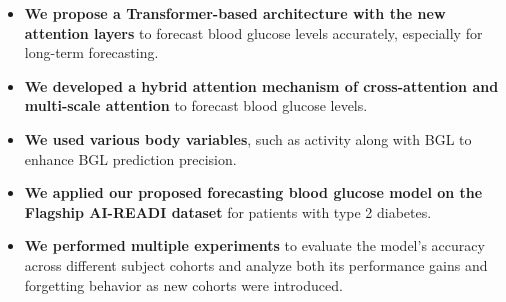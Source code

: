 \begin{itemize}
    \item \textbf{We propose a Transformer-based architecture with the new attention layers} to forecast blood glucose levels accurately, especially for long-term forecasting.
    \item \textbf{We developed a hybrid attention mechanism of cross-attention and multi-scale attention} to forecast blood glucose levels.
    \item \textbf{We used various body variables}, such as activity along with BGL to enhance BGL prediction precision.
    \item \textbf{We applied our proposed forecasting blood glucose model on the Flagship AI-READI dataset} for patients with type 2 diabetes.
    \item \textbf{We performed multiple experiments} to evaluate the model’s accuracy across different subject cohorts and analyze both its performance gains and forgetting behavior as new cohorts were introduced.

\end{itemize}




    
    
